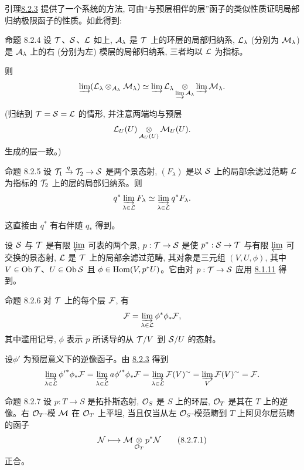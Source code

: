 引理\pageoriginale \hyperref[V.lem8.2.3]{8.2.3} 提供了一个系统的方法, 可由“与预层相伴的层”函子的类似性质证明局部归纳极限函子的性质。如此得到:

\begin{enonce*}{命题 8.2.4}
设 ${\mathcal T}$、${\mathcal S}$、${\mathcal L}$ 如上, ${\mathcal A}_\lambda$ 是 ${\mathcal T}$ 上的环层的局部归纳系, ${\mathcal L}_\lambda$ (分别为 ${\mathcal M}_\lambda$) 是 ${\mathcal A}_\lambda$ 上的右 (分别为左) 模层的局部归纳系, 三者均以 ${\mathcal L}$ 为指标。

则
$$
\varinjlim({\mathcal L}_\lambda\otimes_{{\mathcal A}_\lambda}{\mathcal M}_\lambda)
\simeq\varinjlim{\mathcal L}_\lambda
\mathop{\otimes}_{\varinjlim{\mathcal A}_\lambda}
\varinjlim{\mathcal M}_\lambda{}.
$$
\end{enonce*}

(归结到 ${\mathcal T}={\mathcal S}={\mathcal L}$ 的情形, 并注意两端均与预层
$$
{\mathcal L}_U(U)\mathop{\otimes}_{{\mathcal A}_U(U)}{\mathcal M}_U(U){}.
$$
生成的层一致。)

\begin{enonce*}{命题 8.2.5}
设 $\Tt_1\xrightarrow{q}\Tt_2\to\Ss$ 是两个景态射, $(F_\lambda)$ 是以 ${\mathcal S}$ 上的局部余滤过范畴 ${\mathcal L}$ 为指标的 ${\mathcal T}_2$ 上的层的局部归纳系。则
$$
q^{\ast}\varinjlim_{\lambda\in{\mathcal L}}F_\lambda\simeq
\varinjlim_{\lambda\in{\mathcal L}}q^{\ast}F_\lambda{}.
$$
\end{enonce*}

这直接由 $q^{\ast}$ 有右伴随 $q_\ast$ 得到。

设 ${\mathcal S}$ 与 ${\mathcal T}$ 是有限 $\varprojlim$ 可表的两个景, $p:\Tt\to\Ss$ 是使 $p^{\ast}:\Ss\to\Tt$ 与有限 $\varprojlim$ 可交换的景态射, ${\mathcal L}$ 是 ${\mathcal T}$ 上的局部余滤过范畴, 其对象是三元组 $(V,U,\phi)$, 其中 $V\in\operatorname{Ob}{\mathcal T}$、$U\in\operatorname{Ob}{\mathcal S}$ 且 $\phi\in\operatorname{Hom}(V,p^{\ast}U)$。它由对 $p:\Tt\to\Ss$ 应用 \hyperref[V.lem8.1.11]{8.1.11} 得到。

\begin{enonce*}{命题 8.2.6}
对 ${\mathcal T}$ 上的每个层 ${\mathcal F}$, 有
$$
{\mathcal F}=\varinjlim_{\lambda\in{\mathcal L}}\phi^{\ast}\phi_\ast{\mathcal F},
$$
其中滥用记号, $\phi$ 表示 $p$ 所诱导的从 ${\mathcal T}/V$ 到 ${\mathcal S}/U$ 的态射。
\end{enonce*}

设\pageoriginale $\phi'$ 为预层意义下的逆像函子。由 \hyperref[V.lem8.2.3]{8.2.3} 得到
$$
\varinjlim_{\lambda\in{\mathcal L}}{\phi'}^{\ast}\phi_\ast{\mathcal F}
=\varinjlim_{\lambda\in{\mathcal L}}a{\phi'}^{\ast}\phi_\ast{\mathcal F}
=\varinjlim_{\lambda\in{\mathcal L}}{\mathcal F}(V)^{\sim}
=\varinjlim_V{\mathcal F}(V)^{\sim}={\mathcal F}{}.
$$

\begin{enonce*}{命题 8.2.7}
设 $p:T\to S$ 是拓扑斯态射, ${\mathcal O}_S$ 是 $S$ 上的环层, ${\mathcal O}_T$ 是其在 $T$ 上的逆像。右 ${\mathcal O}_T$-模 ${\mathcal M}$ 在 ${\mathcal O}_T$ 上平坦, 当且仅当从左 ${\mathcal O}_S$-模范畴到 $T$ 上阿贝尔层范畴的函子
\begin{equation*}
{\mathcal N}\longmapsto{\mathcal M}\mathop{\otimes}_{{\mathcal O}_T}p^{\ast}{\mathcal N}
\tag{8.2.7.1}
\end{equation*}
正合。
\end{enonce*}

